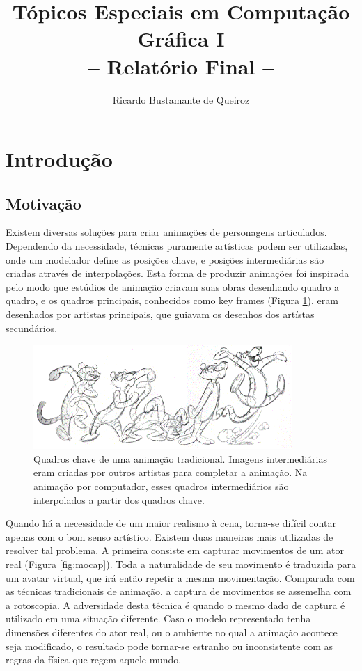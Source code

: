 \documentclass{article}
\author{Ricardo Bustamante de Queiroz}
\title{Tópicos Especiais em Computação Gráfica I\\-- Relatório Final --}
\begin{document}
\maketitle
\tableofcontents

\section{Introdução}

\subsection{Motivação}

Existem diversas soluções para criar animações de personagens articulados. Dependendo da necessidade, técnicas puramente artísticas podem ser utilizadas, onde um modelador define as posições chave, e posições intermediárias são criadas através de interpolações. Esta forma de produzir animações foi inspirada pelo modo que estúdios de animação criavam suas obras desenhando quadro a quadro, e os quadros principais, conhecidos como key frames (Figura \ref{fig:keyframe}), eram desenhados por artistas principais, que guiavam os desenhos dos artístas secundários.

\begin{figure}[ht]
  \centering
  \includegraphics[height=150px]{images/tiger_keys.png}
  \caption{Quadros chave de uma animação tradicional. Imagens intermediárias eram criadas por outros artistas para completar a animação. Na animação por computador, esses quadros intermediários são interpolados a partir dos quadros chave.}
  \label{fig:keyframe}
\end{figure}

Quando há a necessidade de um maior realismo à cena, torna-se difícil contar apenas com o bom senso artístico. Existem duas maneiras mais utilizadas de resolver tal problema.
A primeira consiste em capturar movimentos de um ator real (Figura \ref{fig:mocap}). Toda a naturalidade de seu movimento é traduzida para um avatar virtual, que irá então repetir a mesma movimentação. Comparada com as técnicas tradicionais de animação, a captura de movimentos se assemelha com a rotoscopia. A adversidade desta técnica é quando o mesmo dado de captura é utilizado em uma situação diferente. Caso o modelo representado tenha dimensões diferentes do ator real, ou o ambiente no qual a animação acontece seja modificado, o resultado pode tornar-se estranho ou inconsistente com as regras da física que regem aquele mundo.
\end{document}
